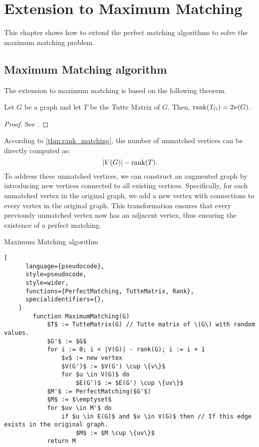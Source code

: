 \chapter{Extension to Maximum Matching}
\label{chap:maximum_matching}

This chapter shows how to extend the perfect matching algorithms to solve the maximum matching problem.

\section{Maximum Matching algorithm}

The extension to maximum matching is based on the following theorem.
\begin{theorem}
\label{thm:rank_matching}
    Let \(G\) be a graph and let \(T\) be the Tutte Matrix of \(G\).
    Then, \(\operatorname{rank}(T_G) = 2\nu(G)\).
\end{theorem}

\begin{proof}
  See \citet[p.~560]{Rabin1989}.
\end{proof}

According to \cref{thm:rank_matching}, the number of unmatched vertices can be directly computed as:
\[
    |V(G)| - \operatorname{rank}(T).
\]
To address these unmatched vertices, we can construct an augmented graph by introducing new vertices connected to all existing vertices. 
Specifically, for each unmatched vertex in the original graph, we add a new vertex with connections to every vertex in the original graph. 
This transformation ensures that every previously unmatched vertex now has an adjacent vertex, thus ensuring the existence of a perfect matching.

\newpage
\begin{programruledcaption}{Maximum Matching algorithm}
    \begin{lstlisting}[
      language={pseudocode},
      style=pseudocode,
      style=wider,
      functions={PerfectMatching, TutteMatrix, Rank},
      specialidentifiers={},
    ]
        function MaximumMatching(G)
            $T$ := TutteMatrix(G) // Tutte matrix of \(G\) with random values.
            $G'$ := $G$
            for i := 0; i < |V(G)| - rank(G); i := i + 1 
                $v$ := new vertex
                $V(G')$ := $V(G') \cup \{v\}$
                for $u \in V(G)$ do 
                    $E(G')$ := $E(G') \cup \{uv\}$
            $M'$ := PerfectMatching($G'$)
            $M$ := $\emptyset$
            for $uv \in M'$ do 
                if $u \in E(G)$ and $v \in V(G)$ then // If this edge exists in the original graph.
                    $M$ := $M \cup \{uv\}$
            return M
    \end{lstlisting}
\end{programruledcaption}

